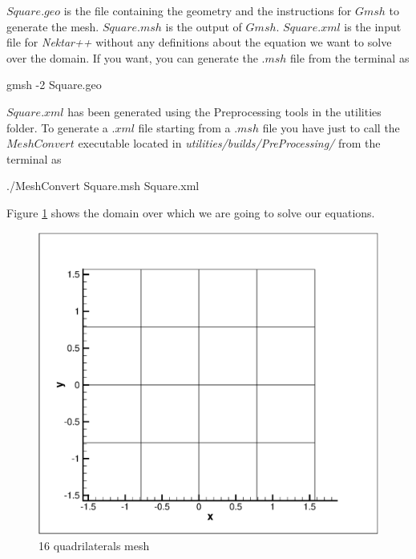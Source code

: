 \documentclass[12pt]{article}
\begin{document}
\noindent
$Square.geo$ is the file containing the geometry and the instructions for $Gmsh$ to generate the mesh. $Square.msh$ is the output of $Gmsh$.
$Square.xml$ is the input file for \emph{Nektar++} without any definitions about the equation we want to solve over the domain.
If you want, you can generate the $.msh$ file from the terminal as

\vspace{5mm}
\begin{algorithm2e}[H]
gmsh -2 Square.geo
\end{algorithm2e}
\vspace{5mm}


\noindent
$Square.xml$ has been generated using the Preprocessing tools in the utilities folder.
To generate a $.xml$ file starting from a $.msh$ file you have just to call the $MeshConvert$ executable located in \emph{utilities/builds/PreProcessing/}
from the terminal as

\vspace{5mm}
\begin{algorithm2e}[H]
./MeshConvert Square.msh Square.xml
\end{algorithm2e}
\vspace{5mm}

Figure \ref{fig:Mesh} shows the domain over which we are going to solve our equations.

\begin{figure}
\centering
\includegraphics[scale=0.35]{mesh.eps}
\caption{16 quadrilaterals mesh}
\label{fig:Mesh}
\end{figure}
\end{document}
